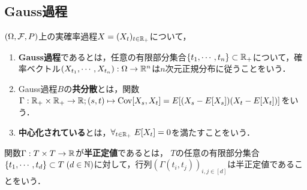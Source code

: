\documentclass[uplatex,dvipdfmx]{jsreport}
\begin{document}
\subsection{Gauss過程}

\begin{definition}
    $(\Omega,\mathcal{F},P)$上の実確率過程$X=(X_t)_{t\in\mathbb{R}_+}$について，
    \begin{enumerate}
        \item \textbf{Gauss過程}であるとは，任意の有限部分集合$\{t_1,\cdots,t_n\}\subset \mathbb{R}_+$について，確率ベクトル$(X_{t_1},\cdots,X_{t_n}):\Omega\to\mathbb{R}^n$は$n$次元正規分布に従うことをいう．
        \item Gauss過程$B$の\textbf{共分散}とは，関数$\Gamma:\mathbb{R}_+\times\mathbb{R}_+\to\mathbb{R};(s,t)\mapsto\mathrm{Cov}[X_s,X_t]=E[(X_s-E[X_s])(X_t-E[X_t])]$をいう．
        \item \textbf{中心化されている}とは，$\forall_{t\in\mathbb{R}_+}\;E[X_t]=0$を満たすことをいう．
    \end{enumerate}
\end{definition}

\begin{definition}
    関数$\Gamma:T\times T\to\mathbb{R}$が\textbf{半正定値}であるとは，
    $T$の任意の有限部分集合$\{t_1,\cdots,t_d\}\subset T\;(d\in\mathbb{N})$に対して，行列$(\Gamma(t_i,t_j))_{i,j\in[d]}$は半正定値であることをいう．
\end{definition}
\end{document}
